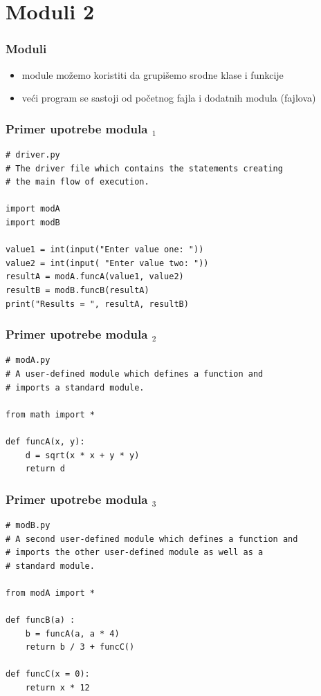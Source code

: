 \documentclass[compress]{beamer}
\begin{document}
\section{Moduli 2}

\begin{frame}[fragile]
  \frametitle{Moduli}
  \begin{itemize}
    \item module možemo koristiti da grupišemo srodne klase i funkcije
    \item veći program se sastoji od početnog fajla i dodatnih modula (fajlova)
  \end{itemize}
\end{frame}

\begin{frame}[fragile]
\frametitle{Primer upotrebe modula $_1$}
\begin{verbatim}
# driver.py
# The driver file which contains the statements creating
# the main flow of execution.

import modA
import modB

value1 = int(input("Enter value one: "))
value2 = int(input( "Enter value two: "))
resultA = modA.funcA(value1, value2)
resultB = modB.funcB(resultA)
print("Results = ", resultA, resultB)
\end{verbatim}
\end{frame}

\begin{frame}[fragile]
\frametitle{Primer upotrebe modula $_2$}
\begin{verbatim}
# modA.py
# A user-defined module which defines a function and
# imports a standard module.

from math import *

def funcA(x, y):
    d = sqrt(x * x + y * y)
    return d
\end{verbatim}
\end{frame}

\begin{frame}[fragile]
\frametitle{Primer upotrebe modula $_3$}
\begin{verbatim}
# modB.py
# A second user-defined module which defines a function and
# imports the other user-defined module as well as a
# standard module.

from modA import *

def funcB(a) :
    b = funcA(a, a * 4)
    return b / 3 + funcC()

def funcC(x = 0):
    return x * 12
\end{verbatim}
\end{frame}
\end{document}
